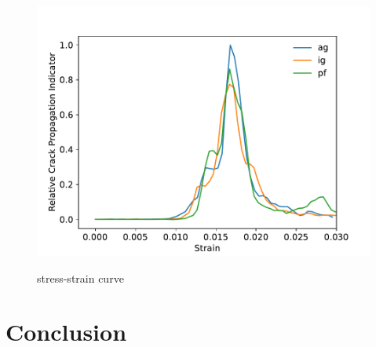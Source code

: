\documentclass[journal,article,submit,moreauthors,pdftex,10pt,a4paper]{Definitions/mdpi}
\begin{document}
	
	\begin{figure}[h]
		\centering
		\includegraphics[width=0.7\linewidth]{img/1stdiv}
		\label{fig:surf}
		\caption{stress-strain curve}
	\end{figure}
	
	
	\section{Conclusion}
	
	
	
\end{document}

